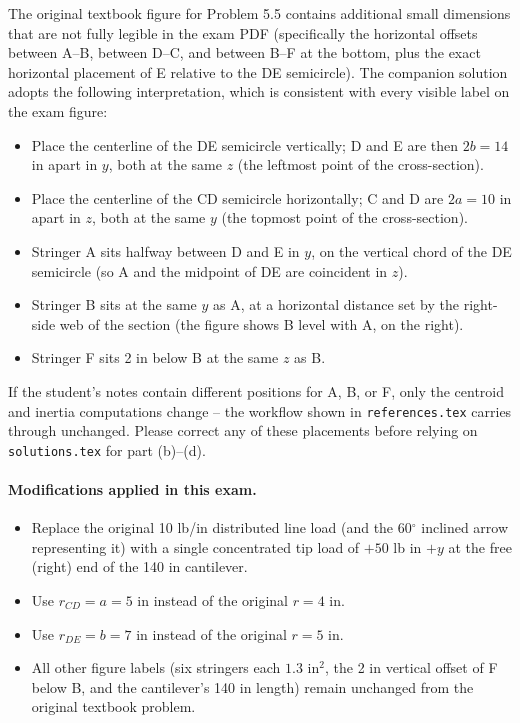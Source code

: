 \documentclass[11pt]{article}
\begin{document}
\begin{verifybox}
The original textbook figure for Problem 5.5 contains additional small dimensions that are not fully legible in the exam PDF (specifically the horizontal offsets between A--B, between D--C, and between B--F at the bottom, plus the exact horizontal placement of E relative to the DE semicircle). The companion solution adopts the following interpretation, which is consistent with every visible label on the exam figure:

\begin{itemize}[leftmargin=2em, itemsep=2pt]
  \item Place the centerline of the DE semicircle vertically; D and E are then $2b = 14$ in apart in $y$, both at the same $z$ (the leftmost point of the cross-section).
  \item Place the centerline of the CD semicircle horizontally; C and D are $2a = 10$ in apart in $z$, both at the same $y$ (the topmost point of the cross-section).
  \item Stringer A sits halfway between D and E in $y$, on the vertical chord of the DE semicircle (so A and the midpoint of DE are coincident in $z$).
  \item Stringer B sits at the same $y$ as A, at a horizontal distance set by the right-side web of the section (the figure shows B level with A, on the right).
  \item Stringer F sits 2 in below B at the same $z$ as B.
\end{itemize}

If the student's notes contain different positions for A, B, or F, only the centroid and inertia computations change -- the workflow shown in \texttt{references.tex} carries through unchanged. Please correct any of these placements before relying on \texttt{solutions.tex} for part (b)--(d).
\end{verifybox}

\paragraph{Modifications applied in this exam.}
\begin{itemize}[leftmargin=2em, itemsep=1pt]
  \item Replace the original 10 lb/in distributed line load (and the 60$^\circ$ inclined arrow representing it) with a single concentrated tip load of $+50$ lb in $+y$ at the free (right) end of the 140 in cantilever.
  \item Use $r_{CD} = a = 5$ in instead of the original $r = 4$ in.
  \item Use $r_{DE} = b = 7$ in instead of the original $r = 5$ in.
  \item All other figure labels (six stringers each $1.3$ in$^2$, the 2 in vertical offset of F below B, and the cantilever's 140 in length) remain unchanged from the original textbook problem.
\end{itemize}
\end{document}
